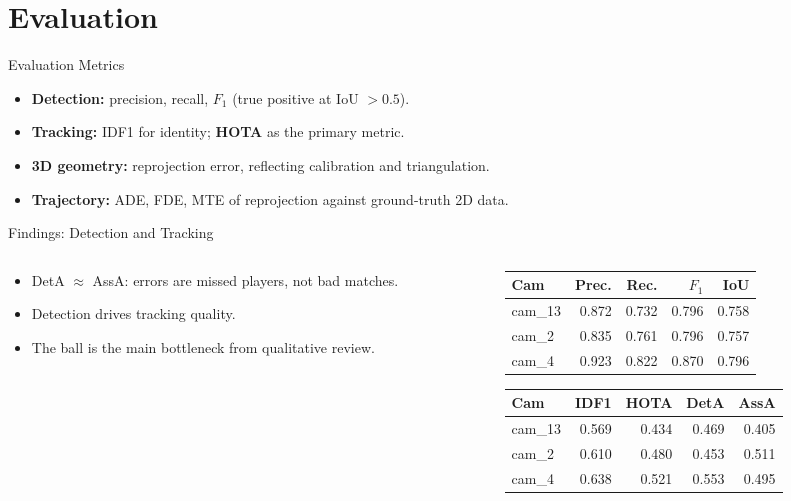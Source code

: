 \section{Evaluation}
\label{sec:evaluation}
\begin{frame}{Evaluation Metrics}
\begin{itemize}
  \item \textbf{Detection:} precision, recall, $F_1$ (true positive at IoU $> 0.5$).
  \item \textbf{Tracking:} IDF1 for identity; \textbf{HOTA} \cite{hota} as the primary metric.
  \item \textbf{3D geometry:} reprojection error, reflecting calibration and triangulation.
  \item \textbf{Trajectory:} ADE, FDE, MTE of reprojection against ground-truth 2D data.
\end{itemize}
\end{frame}

\begin{frame}{Findings: Detection and Tracking}
\begin{columns}[T]
  \begin{column}{0.52\textwidth}
    \begin{itemize}
      \item DetA $\approx$ AssA: errors are missed players, not bad matches.
      \item Detection drives tracking quality.
      \item The ball is the main bottleneck from qualitative review.
    \end{itemize}
  \end{column}
  \begin{column}{0.46\textwidth}
    \centering
    \scriptsize
    \begin{tabular}{lrrrr}
      \toprule
      Cam & Prec. & Rec. & $F_1$ & IoU \\
      \midrule
      cam\_13 & 0.872 & 0.732 & 0.796 & 0.758 \\
      cam\_2  & 0.835 & 0.761 & 0.796 & 0.757 \\
      cam\_4  & 0.923 & 0.822 & 0.870 & 0.796 \\
      \bottomrule
    \end{tabular}

    \vspace{2em}

    \begin{tabular}{lrrrr}
      \toprule
      Cam & IDF1 & HOTA & DetA & AssA \\
      \midrule
      cam\_13 & 0.569 & 0.434 & 0.469 & 0.405 \\
      cam\_2  & 0.610 & 0.480 & 0.453 & 0.511 \\
      cam\_4  & 0.638 & 0.521 & 0.553 & 0.495 \\
      \bottomrule
    \end{tabular}
  \end{column}
\end{columns}
\end{frame}

